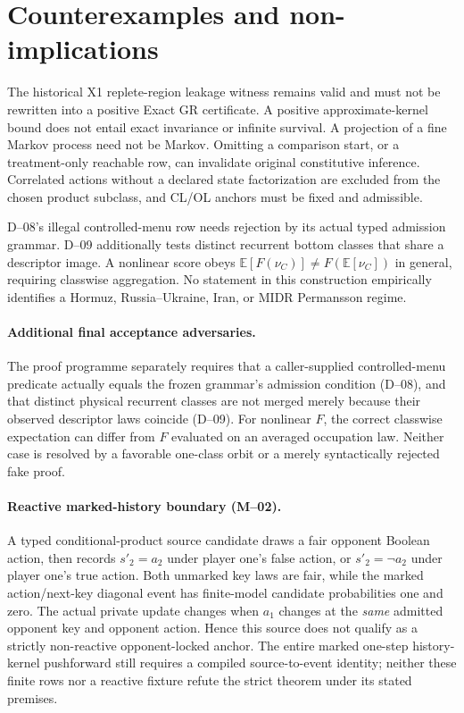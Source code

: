 \section{Counterexamples and non-implications}
The historical X1 replete-region leakage witness remains valid and
must not be rewritten into a positive Exact GR certificate. A positive
approximate-kernel bound does not entail exact invariance or infinite
survival. A projection of a fine Markov process need not be Markov.
Omitting a comparison start, or a treatment-only reachable row, can
invalidate original constitutive inference. Correlated actions without
a declared state factorization are excluded from the chosen product
subclass, and CL/OL anchors must be fixed and admissible.

D--08's illegal controlled-menu row needs rejection by its actual typed
admission grammar. D--09 additionally tests distinct recurrent bottom
classes that share a descriptor image. A nonlinear score obeys
$\mathbb E[F(\nu_C)]\ne F(\mathbb E[\nu_C])$ in general, requiring classwise
aggregation. No statement in this construction empirically identifies
a Hormuz, Russia--Ukraine, Iran, or MIDR Permansson regime.


\paragraph{Additional final acceptance adversaries.}
The proof programme separately requires that a caller-supplied
controlled-menu predicate actually equals the frozen grammar's admission
condition (D--08), and that distinct physical recurrent classes are not
merged merely because their observed descriptor laws coincide (D--09).
For nonlinear $F$, the correct classwise expectation can differ from
$F$ evaluated on an averaged occupation law. Neither case is resolved by
a favorable one-class orbit or a merely syntactically rejected fake proof.


\paragraph{Reactive marked-history boundary (M--02).}
A typed conditional-product source candidate draws a fair opponent
Boolean action, then records $s'_2=a_2$ under player one's false action,
or $s'_2=\neg a_2$ under player one's true action. Both unmarked key
laws are fair, while the marked action/next-key diagonal event has
finite-model candidate probabilities one and zero. The actual private
update changes when $a_1$ changes at the \emph{same} admitted
opponent key and opponent action. Hence this source does not
qualify as a strictly non-reactive opponent-locked anchor.
The entire marked one-step history-kernel pushforward still requires
a compiled source-to-event identity; neither these finite rows nor
a reactive fixture refute the strict theorem under its stated premises.
